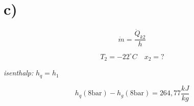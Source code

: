 

\section*{c)}

\[
\dot{m} = \frac{\dot{Q}_{k2}}{h}
\]

\[
T_2 = -22^\circ C \quad x_2 = ?
\]

\textit{isenthalp:} \quad \( h_{q} = h_{1} \)

\[
h_q (8 \text{bar}) - h_g (8 \text{bar}) = 264,77 \frac{kJ}{kg}
\]